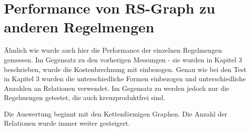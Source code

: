 \section{Performance von RS-Graph zu anderen Regelmengen}


Ähnlich wie \cite{} wurde auch hier die Performance der einzelnen Regelmengen gemessen. Im Gegensatz zu den vorherigen Messungen - sie wurden in Kapitel 3 beschrieben, wurde die Kostenbrechnung mit einbezogen. Genau wie bei den Test in Kapitel 3 wurden die unterschiedliche Formen einbezogen und unterschiedliche Anzahlen an Relationen verwendet. Im Gegensatz zu \cite{} werden jedoch nur die Regelmengen getestet, die auch kreuzproduktfrei sind. 

Die Auswertung beginnt mit den Kettenförmigen Graphen. Die Anzahl der Relationen wurde immer weiter gesteigert. 